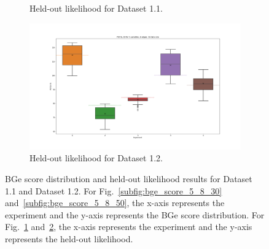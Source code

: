 \documentclass{lxaiproposal}
\begin{document}
\begin{figure}[h]
\begin{subfigure}{0.48\textwidth}
            \caption{Held-out likelihood for Dataset 1.1.}
            \label{subfig:p_d_5_8_30}
        \end{subfigure}
        \begin{subfigure}{0.48\textwidth}
            \centering
            \includegraphics[width=\textwidth]{figures/P_d_prime_5_8_50}
            \caption{Held-out likelihood for Dataset 1.2.}
            \label{subfig:p_d_5_8_50}
        \end{subfigure}
        \caption{BGe score distribution and held-out likelihood results for Dataset 1.1 and Dataset 1.2. For Fig.~\ref{subfig:bge_score_5_8_30} and~\ref{subfig:bge_score_5_8_50}, the x-axis represents the experiment and the y-axis
        represents the BGe score distribution. For Fig.~\ref{subfig:p_d_5_8_30} and~\ref{subfig:p_d_5_8_50}, the x-axis
        represents the experiment and the y-axis represents the held-out likelihood.}
        \label{fig:illustration_5_8}
    \end{figure}
\end{document}
